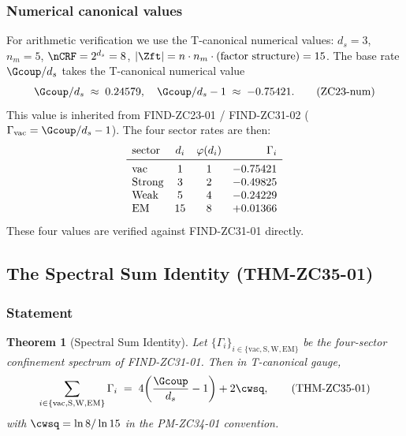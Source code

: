 \documentclass[12pt, a4paper]{article}
\newtheorem{theorem}{Theorem}[section]
\begin{document}
\subsubsection{Numerical canonical values}

For arithmetic verification we use the T-canonical numerical values:
$d_s = 3$, $n_m = 5$, $\nCRF = 2^{d_s} = 8$, $|\Zft| = n \cdot n_m \cdot
\text{(factor structure)} = 15$. The base rate $\Gcoup/d_s$ takes the
T-canonical numerical value
\[
  \Gcoup/d_s \;\approx\; 0.24579,
  \quad
  \Gcoup/d_s - 1 \;\approx\; -0.75421.
  \tag{ZC23-num}\label{eq:zc23num}
\]
This value is inherited from FIND-ZC23-01 / FIND-ZC31-02
($\Gamma_{\rm vac} = \Gcoup/d_s - 1$). The four sector rates are then:
\[
\begin{array}{l@{\quad}c@{\quad}c@{\quad}r}
  \text{sector} & d_i & \varphi(d_i) & \Gamma_i\\
  \midrule
  \text{vac}    & 1   & 1            & -0.75421\\
  \text{Strong} & 3   & 2            & -0.49825\\
  \text{Weak}   & 5   & 4            & -0.24229\\
  \text{EM}     & 15  & 8            & +0.01366
\end{array}
\]
These four values are verified against FIND-ZC31-01 directly.

\subsection{The Spectral Sum Identity (THM-ZC35-01)}
\label{sec:thm-zc35-01}

\subsubsection{Statement}

\begin{theorem}[Spectral Sum Identity]\label{thm:zc35-01}
Let $\{\Gamma_i\}_{i \in \{\text{vac},\text{S},\text{W},\text{EM}\}}$
be the four-sector confinement spectrum of FIND-ZC31-01. Then in
T-canonical gauge,
\begin{equation}
  \sum_{i \in \{\text{vac},\text{S},\text{W},\text{EM}\}}
  \Gamma_i \;=\; 4\!\left(\frac{\Gcoup}{d_s} - 1\right) + 2\cwsq,
  \tag{THM-ZC35-01}\label{eq:thm-zc35-01}
\end{equation}
with $\cwsq = \ln 8 / \ln 15$ in the PM-ZC34-01 convention.
\end{theorem}
\end{document}
